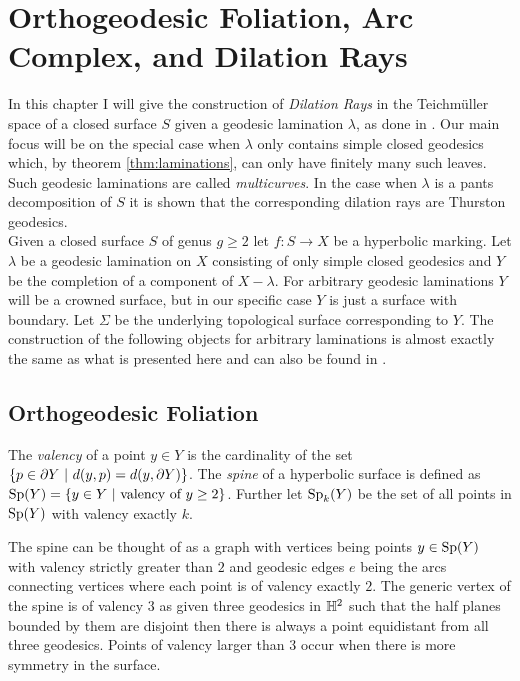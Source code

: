 \chapter{Orthogeodesic Foliation, Arc Complex, and Dilation Rays}
In this chapter I will give the construction of \textit{Dilation Rays} in the Teichm\"{u}ller space of a closed surface $S$ given a geodesic lamination $\lambda$, as done in \cite{farre}. Our main focus will be on the special case when $\lambda$ only contains simple closed geodesics which, by theorem \ref{thm:laminations}, can only have finitely many such leaves. Such geodesic laminations are called \textit{multicurves}. In the case when $\lambda$ is a pants decomposition of $S$ it is shown that the corresponding dilation rays are Thurston geodesics.\\

Given a closed surface $S$ of genus $g\geq 2$ let $f:S\to X$ be a hyperbolic marking. Let $\lambda$ be a geodesic lamination on $X$ consisting of only simple closed geodesics and $Y$ be the completion of a component of $X-\lambda$. For arbitrary geodesic laminations $Y$ will be a crowned surface, but in our specific case $Y$ is just a surface with boundary. Let $\Sigma$ be the underlying topological surface corresponding to $Y$. The construction of the following objects for arbitrary laminations is almost exactly the same as what is presented here and can also be found in \cite{farre}. 
\section{Orthogeodesic Foliation}
\begin{definition}
  The \textit{valency} of a point $y\in Y$ is the cardinality of the set $\{p\in \pa Y\ |\ d(y,p) = d(y, \pa Y)\}$. The \textit{spine} of a hyperbolic surface is defined as $\Sp(Y) = \{y\in Y\ |\ \text{valency of}\ y\geq 2\}$. Further let $\text{Sp}_k(Y)$ be the set of all points in $\text{Sp}(Y)$ with valency exactly $k$.
\end{definition}
The spine can be thought of as a graph with vertices being points $y\in \text{Sp}(Y)$ with valency strictly greater than $2$ and geodesic edges $e$ being the arcs connecting vertices where each point is of valency exactly $2$. The generic vertex of the spine is of valency $3$ as given three geodesics in $\mathbb{H}^2$ such that the half planes bounded by them are disjoint then there is always a point equidistant from all three geodesics. Points of valency larger than $3$ occur when there is more symmetry in the surface.\\

